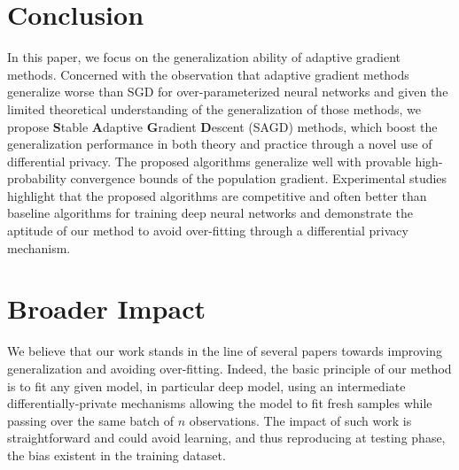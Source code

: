 \documentclass[11pt]{article}
\begin{document}
\section{Conclusion}\label{sec: conclusion}


In this paper, we focus on the generalization ability of adaptive gradient methods. 
Concerned with the observation that adaptive gradient methods generalize worse than SGD for over-parameterized neural networks and given the limited theoretical understanding of the generalization of those methods,
we propose \textbf{S}table \textbf{A}daptive \textbf{G}radient \textbf{D}escent (\textsc{SAGD}) methods, which boost the generalization performance in both theory and practice through a novel use of differential privacy. 
The proposed algorithms generalize well with provable high-probability convergence bounds of the population gradient. 
Experimental studies highlight that the proposed algorithms are competitive and often better than baseline algorithms for training deep neural networks and demonstrate the aptitude of our method to avoid over-fitting through a differential privacy mechanism.

\clearpage

\section{Broader Impact}
We believe that our work stands in the line of several papers towards improving generalization and avoiding over-fitting.
Indeed, the basic principle of our method is to fit any given model, in particular deep model, using an intermediate differentially-private mechanisms allowing the model to fit fresh samples while passing over the same batch of $n$ observations.
The impact of such work is straightforward and could avoid learning, and thus reproducing at testing phase, the bias existent in the training dataset.






\clearpage


\appendix


\end{document}
